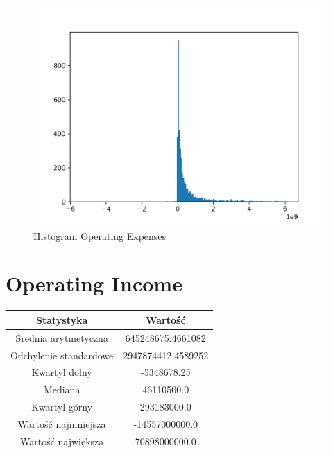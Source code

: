 \documentclass{article}
\begin{document}
\begin{figure}[h!]
    \includegraphics[width=\linewidth]{variables/Operating Expenses.png}
    \caption{Histogram Operating Expenses }
\end{figure}\section{ Operating Income }

\begin{center}
    \begin{tabular}{|c | c|} 
    \hline
    Statystyka & Wartość \\
    \hline\hline
    Średnia arytmetyczna & 645248675.4661082 \\ 
    \hline
    Odchylenie standardowe & 2947874412.4589252 \\
    \hline
    Kwartyl dolny & -5348678.25 \\
    \hline
    Mediana & 46110500.0 \\
    \hline
    Kwartyl górny & 293183000.0 \\
    \hline
    Wartość najmniejsza & -14557000000.0 \\
    \hline
    Wartość największa & 70898000000.0 \\
    \hline
   \end{tabular}
\end{center}
\end{document}
